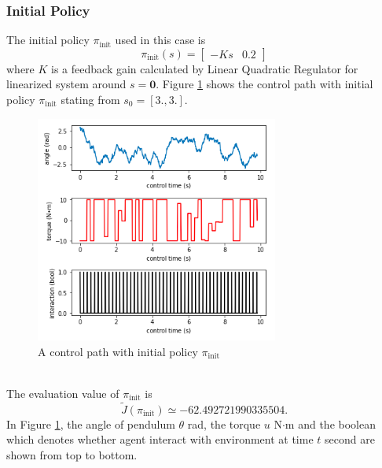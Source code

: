 \documentclass[english, dvipdfmx]{ampmt}             %
\begin{document}
\subsubsection{Initial Policy}
The initial policy $\pi_{\textrm{init}}$ used in this case is
\begin{equation}
	\pi_{\textrm{init}}(s) = \begin{bmatrix}-Ks&0.2\end{bmatrix}
\end{equation}
where $K$ is a feedback gain calculated by Linear Quadratic Regulator for linearized system around $s = \bm{0}$. Figure \ref{sample_02} shows the control path with initial policy $\pi_{\textrm{init}}$ stating from $s_0 = [3., 3.]$.
\begin{figure}[h]
	\centering
 	\includegraphics[width=8cm]{sample_02.png}
 	\caption{A control path with initial policy $\pi_{\textrm{init}}$} \label{sample_02}
\end{figure}\\
The evaluation value of $\pi_{\textrm{init}}$ is
\begin{equation}
	\tilde{J}(\pi_{\textrm{init}}) \simeq -62.492721990335504.
\end{equation}
In Figure \ref{sample_02}, the angle of pendulum $\theta$ rad, the torque $u$ N$\cdot$m and the boolean which denotes whether agent interact with environment at time $t$ second are shown from top to bottom.
\end{document}
